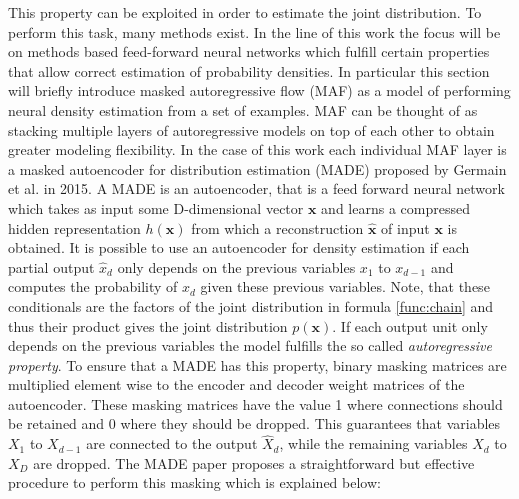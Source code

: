 \documentclass[11pt,titlepage,oneside,openany]{book}
\begin{document}
\noindent This property can be exploited in order to estimate the joint distribution. To perform this task, many methods exist. In the line of this work the focus will be on methods based feed-forward neural networks which fulfill certain properties that allow correct estimation of probability densities. In particular this section will briefly introduce masked autoregressive flow (MAF) \cite{papamakarios_masked_2017} as a model of performing neural density estimation from a set of examples. MAF can be thought of as stacking multiple layers of autoregressive models on top of each other to obtain greater modeling flexibility. In the case of this work each individual MAF layer is a masked autoencoder for distribution estimation (MADE) \cite{germain_made_nodate} proposed by Germain et al. in 2015. A MADE is an autoencoder, that is a feed forward neural network which takes as input some D-dimensional vector $\pmb{x}$ and learns a compressed hidden representation $h(\pmb{x})$ from which a reconstruction $\hat{\pmb{x}}$ of input $\pmb{x}$ is obtained. It is possible to use an autoencoder for density estimation if each partial output $\hat{x}_d$ only depends on the previous variables $x_1$ to $x_{d-1}$ and computes the probability of $x_d$ given these previous variables. Note, that these conditionals are the factors of the joint distribution in formula \ref{func:chain} and thus their product gives the joint distribution $p(\pmb{x})$. If each output unit only depends on the previous variables the model fulfills the so called \emph{autoregressive property}. To ensure that a MADE has this property, binary masking matrices are multiplied element wise to the encoder and decoder weight matrices of the autoencoder. These masking matrices have the value 1 where connections should be retained and 0 where they should be dropped. This guarantees that variables $X_1$ to $X_{d-1}$ are connected to the output $\hat{X}_d$, while the remaining variables $X_d$ to $X_D$ are dropped. The MADE paper \cite{germain_made_nodate} proposes a straightforward but effective procedure to perform this masking which is explained below:
\end{document}
